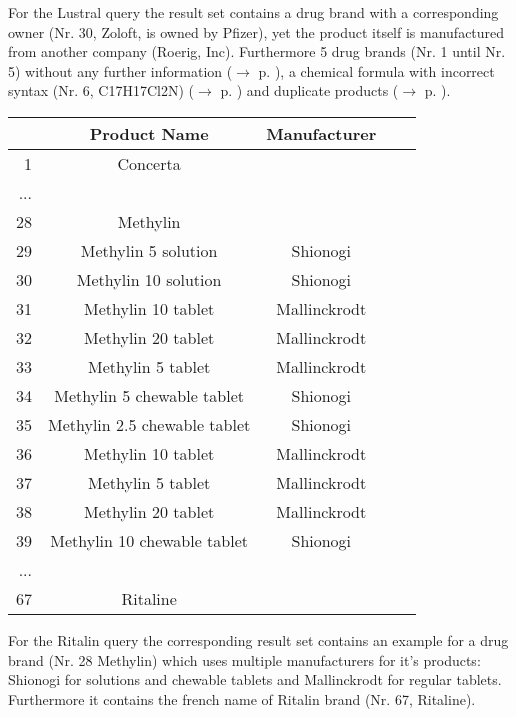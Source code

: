 \documentclass[11pt,titlepage,oneside,openany]{book}
\begin{document}
For the Lustral query the result set contains a drug brand with a corresponding owner (Nr. 30, Zoloft, is owned by Pfizer), yet the product itself is manufactured from another company (Roerig, Inc). Furthermore 5 drug brands (Nr. 1 until Nr. 5) without any further information ($\rightarrow$ p. \pageref{limitations:fb_drugs}), a chemical formula with incorrect syntax (Nr. 6, C17H17Cl2N) ($\rightarrow$ p. \pageref{limitations:filtering}) and duplicate products ($\rightarrow$ p. \pageref{limitations:dubplicates}).

\begin{center}
\begin{tabular}{rccll}
\hline 
 & \textbf{Product Name} &\textbf{ Manufacturer}  \\ 
\hline 
1 & Concerta &  \\ 
\hline 
...  &  &  \\ 
\hline 
28	&Methylin	&\\ 
\hline  
29	&Methylin 5 solution	&Shionogi \\ 
\hline  
30	&Methylin 10 solution	&Shionogi \\ 
\hline 
31	&Methylin 10 tablet	&Mallinckrodt \\ 
\hline 
32	&Methylin 20 tablet	&Mallinckrodt \\ 
\hline 
33	&Methylin 5 tablet	&Mallinckrodt \\ 
\hline 
34	&Methylin 5 chewable tablet	&Shionogi \\ 
\hline 
35	&Methylin 2.5 chewable tablet	&Shionogi \\ 
\hline 
36	&Methylin 10 tablet	&Mallinckrodt \\ 
\hline 
37	&Methylin 5 tablet	&Mallinckrodt \\ 
\hline 
38	&Methylin 20 tablet	&Mallinckrodt \\ 
\hline 
39	&Methylin 10 chewable tablet	&Shionogi\\ 
\hline 
...  &  &  \\ 
\hline  

67 & Ritaline &  \\ 
\hline 
\end{tabular}
\label{example:ritalin}
\end{center}

For the Ritalin query the corresponding result set contains an example for a drug brand (Nr. 28 Methylin) which uses multiple manufacturers for it's products: Shionogi for solutions and chewable tablets and Mallinckrodt for regular tablets. Furthermore it contains the french name of Ritalin brand (Nr. 67, Ritaline).
\end{document}
